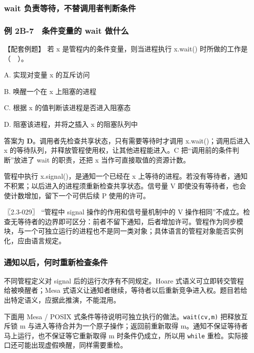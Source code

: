 \subsubsection{wait 负责等待，不替调用者判断条件}\label{OS02-auto-20}

\subsubsection{例 2B-7　条件变量的 wait 做什么}\label{OS02-ex-2018}

\begin{example}[配套例题]

【配套例题】 若 x 是管程内的条件变量，则当进程执行 x.wait() 时所做的工作是（　）。

A. 实现对变量 x 的互斥访问

B. 唤醒一个在 x 上阻塞的进程

C. 根据 x 的值判断该进程是否进入阻塞态

D. 阻塞该进程，并将之插入 x 的阻塞队列中

\end{example}

答案为 \textbf{D}。调用者先检查共享状态，只有需要等待时才调用 x.wait()；调用后进入 x 的等待队列，并释放管程使用权，让其他进程能进入。C 把``调用前的条件判断''放进了 wait 的职责，还把 x 当作可直接取值的资源计数。

管程中执行 x.signal()，是通知一个已经在 x 上等待的进程。若没有等待者，通知不积累；以后进入的进程须重新检查共享状态。信号量 V 即使没有等待者，也会使计数增加，留下一个可供后续 P 使用的许可。

〖2.3-029〗 ``管程中 signal 操作的作用和信号量机制中的 V 操作相同''不成立。检查无等待者的边界即可区分：前者不留下通知，后者增加许可。管程作为同步模块，与一个可独立运行的进程也不是同一类对象；具体语言的管程对象能否实例化，应由语言规定。

\subsubsection{通知以后，何时重新检查条件}\label{OS02-auto-21}

不同管程定义对 signal 后的运行次序有不同规定。Hoare 式语义可立即转交管程给被唤醒者；Mesa 式语义让通知者继续，等待者以后重新竞争进入权。题目若给出特定语义，应据此推演，不能混用。

下面用 Mesa / POSIX 式条件等待说明可独立执行的做法。\texttt{wait(\allowbreak{}cv,\allowbreak{}m)\allowbreak{}} 把释放互斥锁 m 与进入等待合并为一个原子操作；返回前重新取得 m。通知不保证等待者马上运行，也不保证等它重新取得 m 时条件仍成立，所以用 \texttt{while} 重检。实际接口还可能出现虚假唤醒，同样需要重检。

